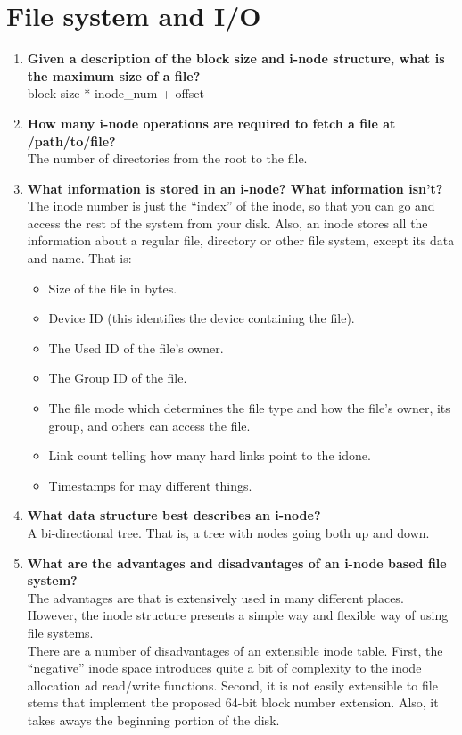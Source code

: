 \documentclass[a4paper]{article}
\begin{document}
\section{File system and I/O} %
\label{sec:File system and I/O}
\begin{enumerate}
  \item {\bf Given a description of the block size and i-node structure, what is the maximum size of a file? } \\
    block size * inode\_num + offset
  \item {\bf How many i-node operations are required to fetch a file at /path/to/file? }\\
    The number of directories from the root to the file. 

  \item {\bf What information is stored in an i-node?  What information isn’t? } \\
    The inode number  is just the ``index'' of the inode, so that you can go and access the rest of the system from your disk. Also, an inode stores all the information about a regular file, directory or other file system, except its data and name. That is:
    \begin{itemize}
      \item Size of the file in bytes.
      \item Device ID (this identifies the device containing the file).
      \item The Used ID of the file's owner.
      \item The Group ID of the file.
      \item The file mode which determines the file type and how the file's owner, its group, and others can access the file.
      \item Link count telling how many hard links point to the idone.
      \item Timestamps for may different things.
    \end{itemize}

  \item {\bf What data structure best describes an i-node? } \\
    A bi-directional tree. That is, a tree with nodes going both up and down.

  \item {\bf What are the advantages and disadvantages of an i-node based file system? }\\
    The advantages are that is extensively used in many different places. However, the inode structure presents a simple way and flexible way of using file systems. \\
    There are a number of disadvantages of an extensible inode table. First, the ``negative'' inode space introduces quite a bit of complexity to the inode allocation ad read/write functions. Second, it is not easily extensible to file stems that implement the proposed 64-bit block number extension. Also, it takes aways the beginning portion of the disk.


\end{enumerate}
\end{document}
